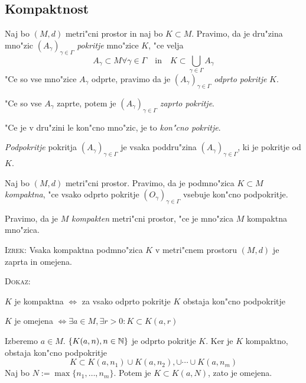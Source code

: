 \subsection{Kompaktnost}
 Naj bo $(M, d)$ metri"cni prostor in naj bo $K \subset M$. Pravimo, da je dru"zina mno"zic $(A_\gamma)_{\gamma \in \Gamma}$ \emph{pokritje} mno"zice $K$, "ce velja
\begin{equation*}
A_\gamma \subset M \forall \gamma \in \Gamma \quad \text{in} \quad K \subset \bigcup_{\gamma \in \Gamma} A_\gamma
\end{equation*}
"Ce so vse mno"zice $A_\gamma$ odprte, pravimo da je $(A_\gamma)_{\gamma \in \Gamma}$ \emph{odprto pokritje} $K$.

"Ce so vse $A_\gamma$ zaprte, potem je $(A_\gamma)_{\gamma \in \Gamma}$ \emph{zaprto pokritje}.

"Ce je v dru"zini le kon"cno mno"zic, je to \emph{kon"cno pokritje}.

\emph{Podpokritje} pokritja $(A_\gamma)_{\gamma \in \Gamma}$ je vsaka poddru"zina $(A_\gamma)_{\gamma \in \Gamma}$, ki je pokritje od $K$.

 Naj bo $(M, d)$ metri"cni prostor. Pravimo, da je podmno"zica $K \subset M$ \emph{kompaktna}, "ce vsako odprto pokritje $(O_\gamma)_{\gamma \in \Gamma}$ vsebuje kon"cno podpokritje.

Pravimo, da je $M$ \emph{kompakten} metri"cni prostor, "ce je mno"zica $M$ kompaktna mno"zica.

\textsc{Izrek:} Vsaka kompaktna podmno"zica $K$ v metri"cnem prostoru $(M, d)$ je zaprta in omejena.

\textsc{Dokaz:} 

$K$ je kompaktna $\iff$ za vsako odprto pokritje $K$ obstaja kon"cno podpokritje

$K$ je omejena $\iff \exists a \in M, \exists r > 0: K \subset K(a, r)$

Izberemo $a \in M$. $\{ K(a, n), n \in \mathbb{N} \}$ je odprto pokritje $K$. Ker je $K$ kompaktno, obstaja kon"cno podpokritje
\begin{equation*}
K \subset K(a, n_1) \cup K(a, n_2), \cup \cdots \cup K(a, n_m)
\end{equation*}
Naj bo $N := \max \{ n_1, \ldots, n_m \}$. Potem je $K \subset K(a, N)$, zato je omejena.


